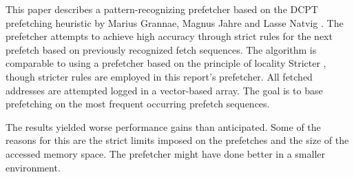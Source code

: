 This paper describes a pattern-recognizing prefetcher based on the DCPT prefetching heuristic by Marius Grannae, Magnus Jahre and Lasse Natvig \cite{reference:jahre}. The prefetcher attempts to achieve high accuracy through strict rules for the next prefetch based on previously recognized fetch sequences. The algorithm is comparable to using a prefetcher based on the principle of locality Stricter , though stricter rules are employed in this report's prefetcher. All fetched addresses are attempted logged in a vector-based array. The goal is to base prefetching on the most frequent occurring prefetch sequences. 

The results yielded worse performance gains than anticipated. Some of the reasons for this are the strict limits imposed on the prefetches and the size of the accessed memory space. The prefetcher might have done better in a smaller environment.